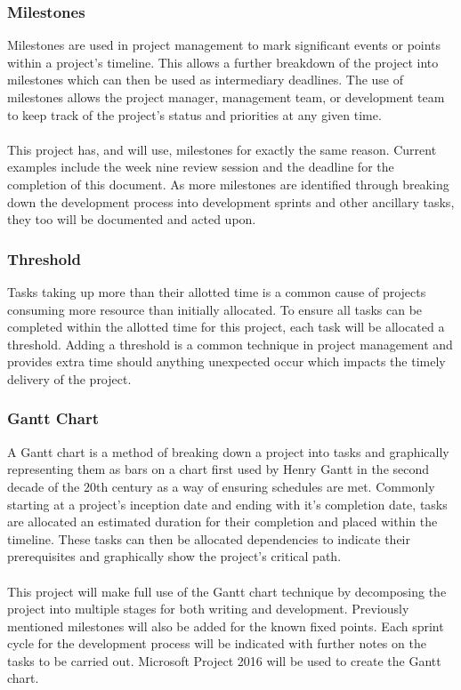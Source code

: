 	\subsubsection{Milestones}
		Milestones are used in project management to mark significant events or points within a project’s timeline. This allows a further breakdown of the project into milestones which can then be used as intermediary deadlines. The use of milestones allows the project manager, management team, or development team to keep track of the project’s status and priorities at any given time.
		\\\\
		This project has, and will use, milestones for exactly the same reason. Current examples include the week nine review session and the deadline for the completion of this document. As more milestones are identified through breaking down the development process into development sprints and other ancillary tasks, they too will be documented and acted upon.
	\subsubsection{Threshold}
		Tasks taking up more than their allotted time is a common cause of projects consuming more resource than initially allocated. To ensure all tasks can be completed within the allotted time for this project, each task will be allocated a threshold. Adding a threshold is a common technique in project management and provides extra time should anything unexpected occur which impacts the timely delivery of the project.
	\subsubsection{Gantt Chart}\label{sec:methodology_gantt}
		A Gantt chart is a method of breaking down a project into tasks and graphically representing them as bars on a chart first used by Henry Gantt in the second decade of the 20th century as a way of ensuring schedules are met. Commonly starting at a project’s inception date and ending with it’s completion date, tasks are allocated an estimated duration for their completion and placed within the timeline. These tasks can then be allocated dependencies to indicate their prerequisites and graphically show the project’s critical path.
		\\\\
		This project will make full use of the Gantt chart technique by decomposing the project into multiple stages for both writing and development. Previously mentioned milestones will also be added for the known fixed points. Each sprint cycle for the development process will be indicated with further notes on the tasks to be carried out. Microsoft Project 2016 will be used to create the Gantt chart.
